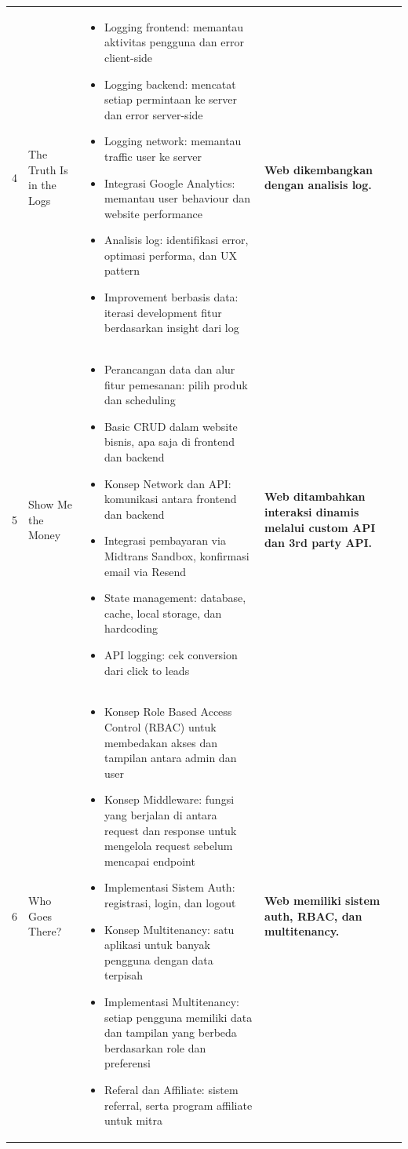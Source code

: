 \documentclass[10pt,a4paper]{article}
\begin{document}
{\begin{tabularx}{\textwidth}{c P{2cm} >{\raggedright\arraybackslash}X P{3.8cm}}
4 & The Truth Is in the Logs
& \begin{itemize}[nosep,leftmargin=*]
\item Logging frontend: memantau aktivitas pengguna dan error client-side
\item Logging backend: mencatat setiap permintaan ke server dan error server-side
\item Logging network: memantau traffic user ke server
\item Integrasi Google Analytics: memantau user behaviour dan website performance
\item Analisis log: identifikasi error, optimasi performa, dan UX pattern
\item Improvement berbasis data: iterasi development fitur berdasarkan insight dari log
\end{itemize}
& \textbf{Web dikembangkan dengan analisis log.}\\

5 & Show Me the Money
& \begin{itemize}[nosep,leftmargin=*]
\item Perancangan data dan alur fitur pemesanan: pilih produk dan scheduling
\item Basic CRUD dalam website bisnis, apa saja di frontend dan backend
\item Konsep Network dan API: komunikasi antara frontend dan backend
\item Integrasi pembayaran via Midtrans Sandbox, konfirmasi email via Resend
\item State management: database, cache, local storage, dan hardcoding
\item API logging: cek conversion dari click to leads
\end{itemize}
& \textbf{Web ditambahkan interaksi dinamis melalui custom API dan 3rd party API.}\\

6 & Who Goes There?
& \begin{itemize}[nosep,leftmargin=*]
\item Konsep Role Based Access Control (RBAC) untuk membedakan akses dan tampilan antara admin dan user
\item Konsep Middleware: fungsi yang berjalan di antara request dan response untuk mengelola request sebelum mencapai endpoint
\item Implementasi Sistem Auth: registrasi, login, dan logout
\item Konsep Multitenancy: satu aplikasi untuk banyak pengguna dengan data terpisah
\item Implementasi Multitenancy: setiap pengguna memiliki data dan tampilan yang berbeda berdasarkan role dan preferensi
\item Referal dan Affiliate: sistem referral, serta program affiliate untuk mitra
\end{itemize}
& \textbf{Web memiliki sistem auth, RBAC, dan multitenancy.}\\


\end{tabularx}}
\end{document}
